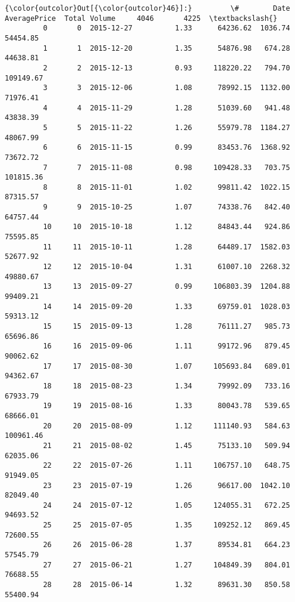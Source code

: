 \documentclass[11pt]{article}
\begin{document}
\begin{Verbatim}[commandchars=\\\{\}]
{\color{outcolor}Out[{\color{outcolor}46}]:}         \#        Date  AveragePrice  Total Volume     4046       4225  \textbackslash{}
         0       0  2015-12-27          1.33      64236.62  1036.74   54454.85   
         1       1  2015-12-20          1.35      54876.98   674.28   44638.81   
         2       2  2015-12-13          0.93     118220.22   794.70  109149.67   
         3       3  2015-12-06          1.08      78992.15  1132.00   71976.41   
         4       4  2015-11-29          1.28      51039.60   941.48   43838.39   
         5       5  2015-11-22          1.26      55979.78  1184.27   48067.99   
         6       6  2015-11-15          0.99      83453.76  1368.92   73672.72   
         7       7  2015-11-08          0.98     109428.33   703.75  101815.36   
         8       8  2015-11-01          1.02      99811.42  1022.15   87315.57   
         9       9  2015-10-25          1.07      74338.76   842.40   64757.44   
         10     10  2015-10-18          1.12      84843.44   924.86   75595.85   
         11     11  2015-10-11          1.28      64489.17  1582.03   52677.92   
         12     12  2015-10-04          1.31      61007.10  2268.32   49880.67   
         13     13  2015-09-27          0.99     106803.39  1204.88   99409.21   
         14     14  2015-09-20          1.33      69759.01  1028.03   59313.12   
         15     15  2015-09-13          1.28      76111.27   985.73   65696.86   
         16     16  2015-09-06          1.11      99172.96   879.45   90062.62   
         17     17  2015-08-30          1.07     105693.84   689.01   94362.67   
         18     18  2015-08-23          1.34      79992.09   733.16   67933.79   
         19     19  2015-08-16          1.33      80043.78   539.65   68666.01   
         20     20  2015-08-09          1.12     111140.93   584.63  100961.46   
         21     21  2015-08-02          1.45      75133.10   509.94   62035.06   
         22     22  2015-07-26          1.11     106757.10   648.75   91949.05   
         23     23  2015-07-19          1.26      96617.00  1042.10   82049.40   
         24     24  2015-07-12          1.05     124055.31   672.25   94693.52   
         25     25  2015-07-05          1.35     109252.12   869.45   72600.55   
         26     26  2015-06-28          1.37      89534.81   664.23   57545.79   
         27     27  2015-06-21          1.27     104849.39   804.01   76688.55   
         28     28  2015-06-14          1.32      89631.30   850.58   55400.94   

\end{Verbatim}
\end{document}
